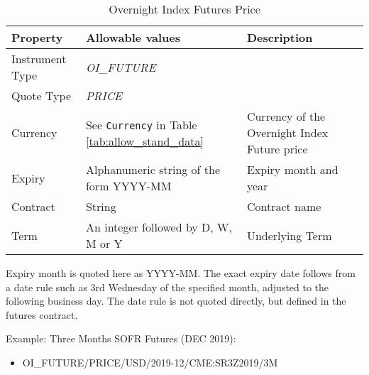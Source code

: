 \begin{table}[H]
\centering
  \begin{tabular}{|p{3cm}|p{4.5cm}|p{7cm}|}
  \hline
    {\bf Property} & {\bf Allowable values} & {\bf Description} \\ \hline
    Instrument Type & \emph{OI\_FUTURE} & \\ \hline
    Quote Type & \emph{PRICE} & \\ \hline
    Currency & See \lstinline!Currency! in Table \ref{tab:allow_stand_data}& Currency of the Overnight Index Future price\\ \hline
    Expiry & Alphanumeric string of the form YYYY-MM & Expiry month and year\\ \hline
    Contract & String & Contract name\\ \hline
    Term & An integer followed by D, W, M or Y & Underlying Term\\ \hline
  \end{tabular}
  \caption{Overnight Index Futures Price}
  \label{tab:oifp_quote}
\end{table}

Expiry month is quoted here as YYYY-MM. The exact expiry date follows from a date rule such as 3rd
Wednesday of the specified month, adjusted to the following business day. The date rule is not quoted directly, but
defined in the futures contract.

\medskip
Example: Three Months SOFR Futures (DEC 2019):
\begin{itemize}
\item {OI\_FUTURE/PRICE/USD/2019-12/CME:SR3Z2019/3M}
\end{itemize}

